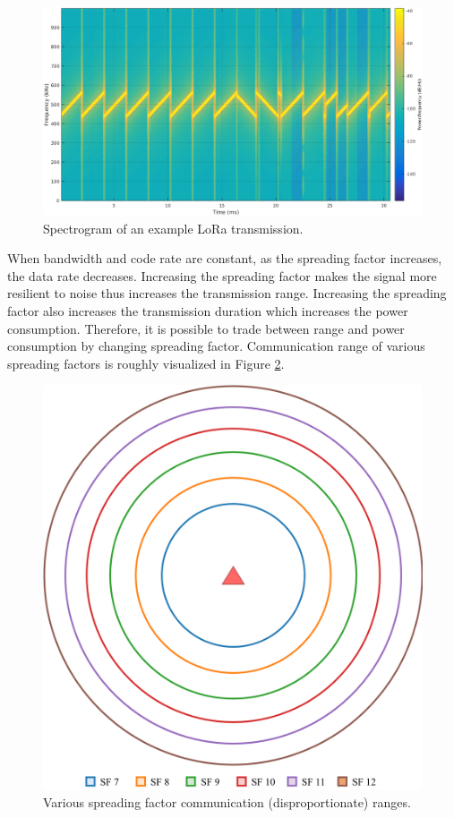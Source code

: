 \begin{figure}
\centering
\includegraphics[width=.7\linewidth]{fig/lora_symbols.png}
\vspace*{4mm}
\caption{Spectrogram of an example LoRa transmission. \cite{sghoslya_lora}}
\label{fig:lora_symbols}
\end{figure}

When bandwidth and code rate are constant, as the spreading factor increases, the data rate decreases. Increasing the spreading factor makes the signal more resilient to noise thus increases the transmission range. Increasing the spreading factor also increases the transmission duration which increases the power consumption. Therefore, it is possible to trade between range and power consumption by changing spreading factor. Communication range of various spreading factors is roughly visualized in Figure \ref{fig:single_gw_empty}.

\begin{figure}
\centering
\includegraphics[width=.7\linewidth]{fig/lora_single_gw_empty.png}
\vspace*{5mm}
\caption{Various spreading factor communication (disproportionate) ranges.}
\label{fig:single_gw_empty}
\end{figure}

